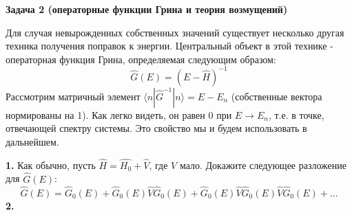 \documentclass[a4paper,12pt]{article}
\begin{document}
\noindent 
\textbf{Задача 2 (операторные функции Грина и теория возмущений)}

\noindent
Для случая невырожденных собственных значений существует несколько другая техника получения поправок к энергии. Центральный объект в этой технике - операторная функция Грина, определяемая следующим образом:
$$
\hat{G}(E)=\left(E-\hat{H}\right)^{-1}
$$
Рассмотрим матричный элемент $\langle n |\hat{G}^{-1}| n \rangle=E-E_n$ (собственные вектора нормированы на 1). Как легко видеть, он равен $0$ при $E\to E_n$, т.е. в точке, отвечающей спектру системы. Это свойство мы и будем использовать в дальнейшем.

\noindent
\textbf{1.} Как обычно, пусть $\hat{H}=\hat{H_0}+\hat{V}$, где $V$ мало. Докажите следующее разложение для $\hat{G}(E)$: 
$$
\hat{G}(E)=\hat{G}_0(E)+\hat{G}_0(E)\hat{V}\hat{G}_0(E)+\hat{G}_0(E)\hat{V}\hat{G}_0(E)\hat{V}\hat{G}_0(E)+...
$$
\textbf{2.}
\end{document}
